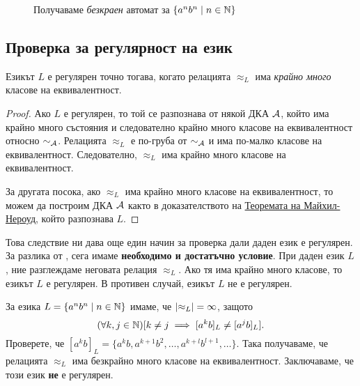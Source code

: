 \begin{example}
\begin{figure}[H]
    \caption{Получаваме {\em безкраен} автомат за $\{a^nb^n \mid n \in \mathbb{N}\}$}
  \end{figure}    
\end{example}

\subsection{Проверка за регулярност на език}

  \begin{prop}
    Езикът $L$ е регулярен точно тогава, когато релацията $\approx_L$ има {\em крайно много} класове на еквивалентност.
  \end{prop}
\begin{proof}
  Ако $L$ е регулярен, то той се разпознава от някой ДКА $\mathcal{A}$, който има крайно много състояния 
  и следователно крайно много класове на еквивалентност относно $\sim_{\mathcal{A}}$.
  Релацията $\approx_L$ е по-груба от $\sim_{\mathcal{A}}$ и има по-малко класове на еквивалентност.
  Следователно, $\approx_L$ има крайно много класове на еквивалентност.
  
  За другата посока, ако $\approx_L$ има крайно много класове на еквивалентност, то можем да 
  построим ДКА $\mathcal{A}$ както в доказателството на \hyperref[th:myhill-nerode]{Теоремата на Майхил-Нероуд}, който разпознава $L$.
\end{proof}

Това следствие ни дава още един начин за проверка дали даден език е регулярен.
За разлика от , сега имаме {\bf необходимо и достатъчно условие}.
При даден език $L$, ние разглеждаме неговата релация $\approx_L$.
Ако тя има крайно много класове, то езикът $L$ е регулярен.
В противен случай, езикът $L$ не е регулярен.

\begin{example}
  За езика $L = \{a^nb^n\mid n \in \mathbb{N}\}$ имаме, че $\lvert{\approx_L}\rvert = \infty$,
  защото \[(\forall k,j\in\mathbb{N})[k \neq j \implies [a^kb]_L \neq [a^jb]_L].\]
  Проверете, че $[a^kb]_L = \{a^kb,a^{k+1}b^{2},\dots,a^{k+l}b^{l+1},\dots\}$.
  Така получаваме, че релацията $\approx_L$ има безкрайно много класове на еквивалентност.
  Заключаваме, че този език {\bf не} е регулярен.
\end{example}


